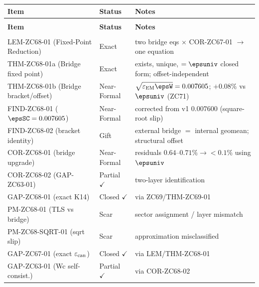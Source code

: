 \documentclass[12pt, a4paper]{article}
\renewcommand{\epsEM}{\varepsilon_{\rm EM}}
\renewcommand{\epscan}{\varepsilon_{\rm can}}
\begin{document}
{\small
\setlength{\LTpre}{4pt}\setlength{\LTpost}{4pt}
\renewcommand{\arraystretch}{1.30}
\begin{longtable}{>{\raggedright\arraybackslash}p{4.2cm}
                  >{\centering\arraybackslash}p{2.4cm}
                  >{\raggedright\arraybackslash}p{6.0cm}}
\toprule
\textbf{Item} & \textbf{Status} & \textbf{Notes} \\
\midrule
\endfirsthead
\multicolumn{3}{l}{\small\textit{(continued)}}\\[4pt]
\toprule\textbf{Item} & \textbf{Status} & \textbf{Notes}\\\midrule
\endhead
\midrule\multicolumn{3}{r}{\small\textit{(continues)}}\\
\endfoot
\bottomrule
\endlastfoot
LEM-ZC68-01 (Fixed-Point Reduction) & Exact
  & two bridge eqs $\times$ COR-ZC67-01 $\to$ one equation \\[4pt]
THM-ZC68-01a (Bridge fixed point) & Exact
  & exists, unique, $=\epsuniv$ closed form; offset-independent \\[4pt]
THM-ZC68-01b (Bridge bracket/offset) & Near-Formal
  & $\sqrt{\epsEM\epsW}=0.007605$; $+0.08\%$ vs $\epsuniv$ (ZC71) \\[4pt]
FIND-ZC68-01 ($\epsSC=0.007605$) & Near-Formal
  & corrected from v1 $0.007600$ (square-root slip) \\[4pt]
FIND-ZC68-02 (bracket identity) & Gift
  & external bridge $=$ internal geomean; structural offset \\[4pt]
COR-ZC68-01 (bridge upgrade) & Near-Formal
  & residuals $0.64$--$0.71\%\to<0.1\%$ using $\epsuniv$ \\[4pt]
COR-ZC68-02 (GAP-ZC63-01) & Partial $\checkmark$
  & two-layer identification \\[4pt]
GAP-ZC68-01 (exact K14) & Closed $\checkmark$
  & via ZC69/THM-ZC69-01 \\[4pt]
PM-ZC68-01 (TLS vs bridge) & Scar
  & sector assignment / layer mismatch \\[4pt]
PM-ZC68-SQRT-01 (sqrt slip) & Scar
  & approximation misclassified \\[4pt]
\midrule
GAP-ZC67-01 (exact $\epscan$) & Closed $\checkmark$
  & via LEM/THM-ZC68-01 \\
GAP-ZC63-01 (Wc self-consist.) & Partial $\checkmark$
  & via COR-ZC68-02 \\
\end{longtable}
}
\end{document}
